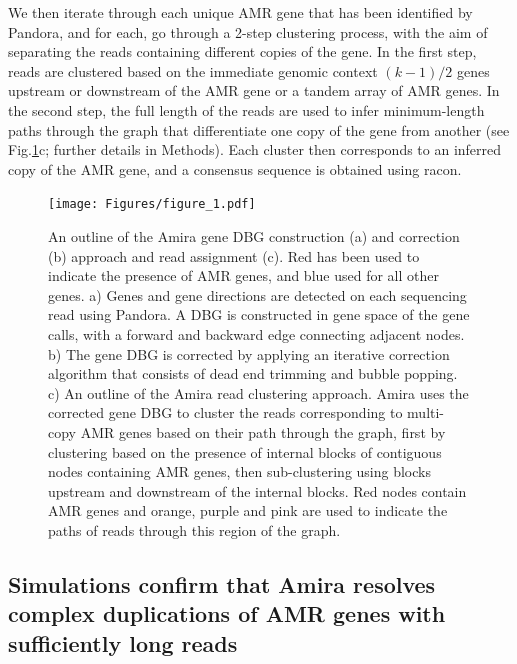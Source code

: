 We then iterate through each unique AMR gene that has been identified by Pandora, and for each, go through a 2-step clustering process, with the aim of separating the reads containing different copies of the gene. In the first step, reads are clustered based on the immediate genomic context $(k - 1) / 2$ genes upstream or downstream of the AMR gene or a tandem array of AMR genes.  In the second step, the full length of the reads are used to infer minimum-length paths through the graph that differentiate one copy of the gene from another (see Fig.\ref{fig:1}c; further details in Methods). Each cluster then corresponds to an inferred copy of the AMR gene, and a consensus sequence is obtained using racon.

\begin{figure}
\centering
\texttt{[image: Figures/figure\_1.pdf]}
\caption{An outline of the Amira gene DBG construction (a) and correction (b) approach and read assignment (c). Red has been used to indicate the presence of AMR genes, and blue used for all other genes. a) Genes and gene directions are detected on each sequencing read using Pandora. A DBG is constructed in gene space of the gene calls, with a forward and backward edge connecting adjacent nodes. b) The gene DBG is corrected by applying an iterative correction algorithm that consists of dead end trimming and bubble popping. c) An outline of the Amira read clustering approach. Amira uses the corrected gene DBG to cluster the reads corresponding to multi-copy AMR genes based on their path through the graph, first by clustering based on the presence of internal blocks of contiguous nodes containing AMR genes, then sub-clustering using blocks upstream and downstream of the internal blocks. Red nodes contain AMR genes and orange, purple and pink are used to indicate the paths of reads through this region of the graph.}
\label{fig:1}
\end{figure}

\subsection*{Simulations confirm that Amira resolves complex duplications of AMR genes with sufficiently long reads}

